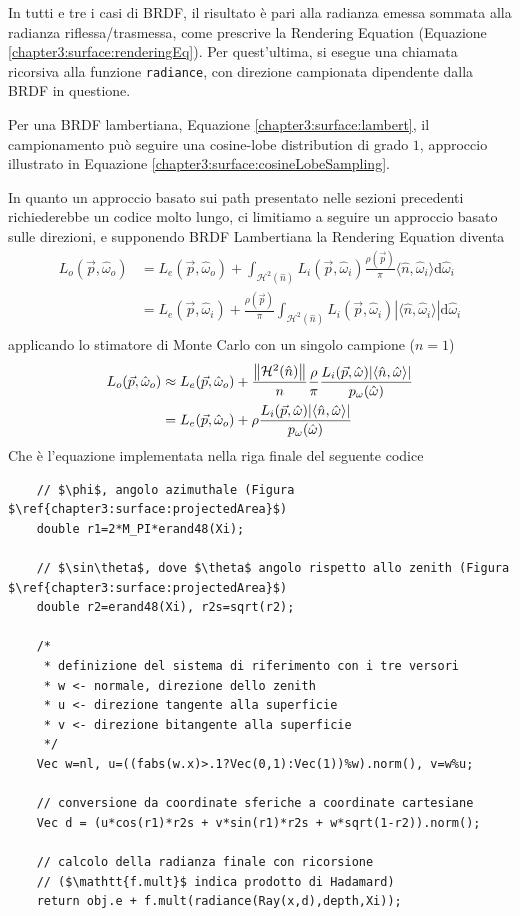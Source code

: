 In tutti e tre i casi di BRDF, il risultato \`e pari alla radianza emessa sommata alla radianza riflessa/trasmessa, come prescrive 
la Rendering Equation (Equazione \ref{chapter3:surface:renderingEq}). Per quest'ultima, si esegue una chiamata ricorsiva alla funzione 
\texttt{radiance}, con direzione campionata dipendente dalla BRDF in questione.\par
Per una BRDF lambertiana, Equazione \ref{chapter3:surface:lambert}, il campionamento pu\`o seguire una cosine-lobe distribution di grado $1$, 
approccio illustrato in Equazione \ref{chapter3:surface:cosineLobeSampling}.\par
In quanto un approccio basato sui path presentato nelle sezioni precedenti richiederebbe un codice molto lungo, ci limitiamo a seguire un approccio
basato sulle direzioni, e supponendo BRDF Lambertiana la Rendering Equation diventa
\begin{align}
	L_o(\vec{p},\hat{\omega}_o)&=L_e(\vec{p},\hat{\omega}_o)+\int_{\mathcal{H}^2(\hat{n})}%
		L_i(\vec{p},\hat{\omega}_i)\frac{\rho(\vec{p})}{\pi}\langle\hat{n},\hat{\omega}_i\rangle\mathrm{d}\hat{\omega}_i\nonumber\\
	&=L_e(\vec{p},\hat{\omega}_i)+\frac{\rho(\vec{p})}{\pi}\int_{\mathcal{H}^2(\hat{n})}%
		L_i(\vec{p},\hat{\omega}_i)|\langle\hat{n},\hat{\omega}_i\rangle|\mathrm{d}\hat{\omega}_i\nonumber\\
\end{align}
applicando lo stimatore di Monte Carlo con un singolo campione ($n=1$)
\begin{align}
	L_o(\vec{p},\hat{\omega}_o)&\approx L_e(\vec{p},\hat{\omega}_o)+\frac{\norm{\mathcal{H}^2(\hat{n})}}{n}\frac{\rho}{\pi}
		\frac{L_i(\vec{p},\hat{\omega})|\langle\hat{n},\hat{\omega}\rangle|}{p_\omega(\hat{\omega})}\nonumber \\
	&=L_e(\vec{p},\hat{\omega}_o)+\rho\frac{L_i(\vec{p},\hat{\omega})|\langle\hat{n},\hat{\omega}\rangle|}{p_\omega(\hat{\omega})}
\end{align}
Che \`e l'equazione implementata nella riga finale del seguente codice
\begin{verbatim}
	// $\phi$, angolo azimuthale (Figura $\ref{chapter3:surface:projectedArea}$)
	double r1=2*M_PI*erand48(Xi);

	// $\sin\theta$, dove $\theta$ angolo rispetto allo zenith (Figura $\ref{chapter3:surface:projectedArea}$)
	double r2=erand48(Xi), r2s=sqrt(r2);

	/*
	 * definizione del sistema di riferimento con i tre versori
	 * w <- normale, direzione dello zenith
	 * u <- direzione tangente alla superficie
	 * v <- direzione bitangente alla superficie
	 */
	Vec w=nl, u=((fabs(w.x)>.1?Vec(0,1):Vec(1))%w).norm(), v=w%u;

	// conversione da coordinate sferiche a coordinate cartesiane
	Vec d = (u*cos(r1)*r2s + v*sin(r1)*r2s + w*sqrt(1-r2)).norm();

	// calcolo della radianza finale con ricorsione
	// ($\mathtt{f.mult}$ indica prodotto di Hadamard)
	return obj.e + f.mult(radiance(Ray(x,d),depth,Xi));
\end{verbatim}
